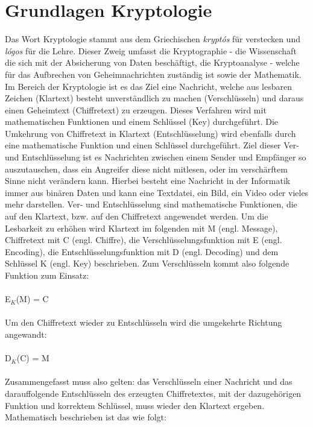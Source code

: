 \documentclass[10pt, a4paper]{scrreprt}
\begin{document}
\chapter{Grundlagen Kryptologie}
Das Wort Kryptologie stammt aus dem Griechischen \textit{kryptós} für verstecken und \textit{lógos} für die Lehre.%
Dieser Zweig umfasst die Kryptographie - die Wissenschaft die sich mit der Absicherung von Daten beschäftigt, die Kryptoanalyse - welche für das Aufbrechen von Geheimnachrichten zuständig ist sowie der Mathematik.
Im Bereich der Kryptologie ist es das Ziel eine Nachricht, welche aus lesbaren Zeichen (Klartext) besteht unverständlich zu machen (Verschlüsseln) und daraus einen Geheimtext (Chiffretext) zu erzeugen. Dieses Verfahren wird mit mathematischen Funktionen und einem Schlüssel (Key) durchgeführt. Die Umkehrung von Chiffretext in Klartext (Entschlüsselung) wird ebenfalls durch eine mathematische Funktion und einen Schlüssel durchgeführt. Ziel dieser Ver- und Entschlüsselung ist es Nachrichten zwischen einem Sender und Empfänger so auszutauschen, dass ein Angreifer diese nicht mitlesen, oder im verschärftem Sinne nicht verändern kann. Hierbei besteht eine Nachricht in der Informatik immer aus binären Daten und kann eine Textdatei, ein Bild, ein Video oder vieles mehr darstellen. Ver- und Entschlüsselung sind mathematische Funktionen, die auf den Klartext, bzw. auf den Chiffretext angewendet werden. Um die Lesbarkeit zu erhöhen wird Klartext im folgenden mit M (engl. Message), Chiffretext mit C (engl. Chiffre), die Verschlüsselungsfunktion mit E (engl. Encoding), die Entschlüsselungsfunktion mit D (engl. Decoding) und dem Schlüssel K (engl. Key) beschrieben.
Zum Verschlüsseln kommt also folgende Funktion zum Einsatz: \\ \\
E$_{K}$(M) = C\\ \\ 
Um den Chiffretext wieder zu Entschlüsseln wird die umgekehrte Richtung angewandt:\\ \\
D$_{K}$(C) = M\\ \\
Zusammengefasst muss also gelten: das Verschlüsseln einer Nachricht und das darauffolgende Entschlüsseln des erzeugten Chiffretextes, mit der dazugehörigen Funktion und korrektem Schlüssel, muss wieder den Klartext ergeben. Mathematisch beschrieben ist das wie folgt:\\ \\
\end{document}
